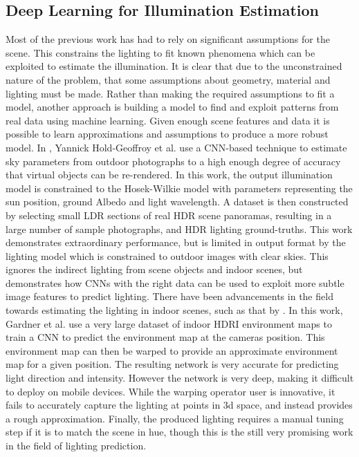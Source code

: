 \documentclass[ %
                    author={Gavin Parker},
                supervisor={Dr. Neill Campbell},
                    degree={MEng},
                     title={Deep Siamese Networks for Illumination Estimation from Stereo Images},
                  subtitle={},
                      type={Research},
                      year={2018} ]{dissertation}
\begin{document}
\subsection{Deep Learning for Illumination Estimation}
Most of the previous work has had to rely on significant assumptions for the scene. This constrains the lighting to fit known phenomena which can be exploited to estimate the illumination. It is clear that due to the unconstrained nature of the problem, that some assumptions about geometry, material and lighting must be made. Rather than making the required assumptions to fit a model, another approach is building a model to find and exploit patterns from real data using machine learning. Given enough scene features and data it is possible to learn approximations and assumptions to produce a more robust model. In \cite{holdgeoffroy-cvpr-17}, Yannick Hold-Geoffroy et al. use a CNN-based technique to estimate sky parameters from outdoor photographs to a high enough degree of accuracy that virtual objects can be re-rendered. In this work, the output illumination model is constrained to the Hosek-Wilkie model with parameters representing the sun position, ground Albedo and light wavelength. A dataset is then constructed by selecting small LDR sections of real HDR scene panoramas, resulting in a large number of sample photographs, and HDR lighting ground-truths. This work demonstrates extraordinary performance, but is limited in output format by the lighting model which is constrained to outdoor images with clear skies. This ignores the indirect lighting from scene objects and indoor scenes, but demonstrates how CNNs with the right data can be used to exploit more subtle image features to predict lighting.
\newline
There have been advancements in the field towards estimating the lighting in indoor scenes, such as that by \cite{Gardner:2017:LPI:3130800.3130891}. In this work, Gardner et al. use a very large dataset of indoor HDRI environment maps to train a CNN to predict the environment map at the cameras position. This environment map can then be warped to provide an approximate environment map for a given position. The resulting network is very accurate for predicting light direction and intensity. However the network is very deep, making it difficult to deploy on mobile devices. While the warping operator user is innovative, it fails to accurately capture the lighting at points in 3d space, and instead provides a rough approximation. Finally, the produced lighting requires a manual tuning step if it is to match the scene in hue, though this is the still very promising work in the field of lighting prediction.
\end{document}
